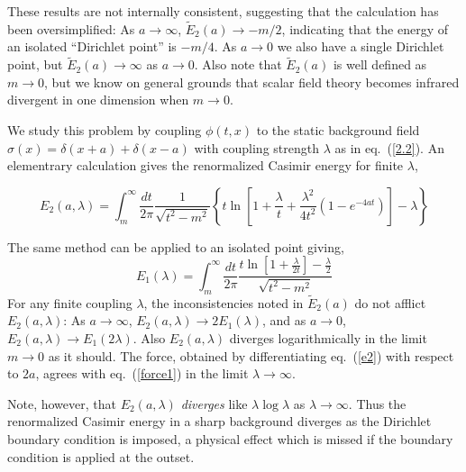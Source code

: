 \documentclass[a4paper,aps,amsfonts,prl,showpacs,nobibnotes,nofootinbib,%
tightenlines,twocolumn]{revtex4}
\begin{document}
These results are not internally consistent, suggesting that the 
calculation has been oversimplified:  As $a\to\infty$,
$\widetilde{E}_{2}(a)\to -m/2$, indicating that the energy of an isolated
``Dirichlet point'' is $-m/4$.  As $a\to 0$ we also have a single
Dirichlet point, but $\widetilde{E}_{2}(a)\to\infty$ as $a\to 0$. 
Also note that $\widetilde{E}_{2}(a)$ is well defined as $m\to 0$, but
we know on general grounds that scalar field theory becomes infrared
divergent in one dimension when $m\to 0$.

We study this problem by coupling $\phi(t,x)$ to the static background
field $\sigma(x)=\delta (x+a) + \delta(x-a)$ with coupling strength
$\lambda$ as in eq.~(\ref{2.2}).  An elementrary calculation gives the
renormalized Casimir energy for finite $\lambda$,
%
\begin{widetext}\vspace*{-\bigskipamount}
\begin{equation}
E_2(a,\lambda)=\int_m^{\infty}\frac{dt}{2\pi}\frac{1}
{\sqrt{t^2-m^2}}\left\{ t \ln \left[
1+\frac{\lambda}{t}+\frac{\lambda^2} {4t^2}(1-e^{-4at})\right] -
\lambda\right\}
\label{e2}
\end{equation}
\end{widetext}
%
The same method can be applied to an isolated point giving,
%
\begin{equation}
    E_{1}(\lambda) =  \int_{m}^{\infty}\frac{dt}{2\pi}
    \frac{t\ln\left[1+\frac{\lambda}{2t}\right]
    -\frac{\lambda}{2}}{\sqrt{t^{2}-m^{2}}}
\end{equation}
%
For any finite coupling $\lambda$, the inconsistencies noted in
$\widetilde{E}_{2}(a)$ do not afflict $E_{2}(a,\lambda)$: As
$a\to\infty$, $E_{2}(a,\lambda)\to 2E_{1}(\lambda)$, and as $a\to 0$,
$E_{2}(a,\lambda)\to E_{1}(2\lambda)$.  Also $E_{2}(a,\lambda)$
diverges logarithmically in the limit $m\to 0$ as it should.  The
force, obtained by differentiating eq.~(\ref{e2}) with respect to
$2a$, agrees with eq.~(\ref{force1}) in the limit $\lambda \to
\infty$.

Note, however, that $E_{2}(a,\lambda)$ \emph{diverges} like 
$\lambda\log\lambda$ as $\lambda\to\infty$.  Thus the renormalized 
Casimir energy in a sharp background diverges as the Dirichlet boundary 
condition is imposed, a physical effect which is missed if the 
boundary condition is applied at the outset.
\end{document}
